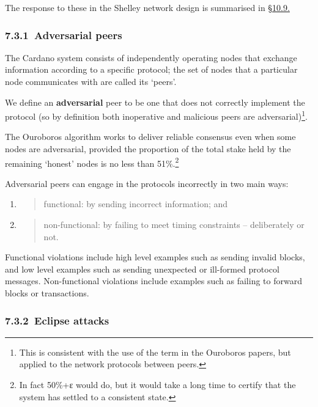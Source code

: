 \documentclass[11pt,a4paper]{article}
\begin{document}
The response to these in the Shelley network design is summarised in
\protect\hyperlink{summary-response-to-threats}{{§10.9.}}

\hypertarget{adversarial-peers}{%
\subsubsection{​7.3.1​~Adversarial peers}\label{adversarial-peers}}

The Cardano system consists of independently operating nodes that
exchange information according to a specific protocol; the set of nodes
that a particular node communicates with are called its `peers'.

We define an \textbf{adversarial} peer to be one that does not correctly
implement the protocol (so by definition both inoperative and malicious
peers are adversarial)\footnote{This is consistent with the use of the
  term in the Ouroboros papers, but applied to the network protocols
  between peers.}.

The Ouroboros algorithm works to deliver reliable consensus even when
some nodes are adversarial, provided the proportion of the total stake
held by the remaining `honest' nodes is no less than 51\%.\footnote{In
  fact 50\%+ε would do, but it would take a long time to certify that
  the system has settled to a consistent state.}

Adversarial peers can engage in the protocols incorrectly in two main
ways:

\begin{enumerate}
\def\labelenumi{\arabic{enumi}.}
\item
  \begin{quote}
  functional: by sending incorrect information; and
  \end{quote}
\item
  \begin{quote}
  non-functional: by failing to meet timing constraints -- deliberately
  or not.
  \end{quote}
\end{enumerate}

Functional violations include high level examples such as sending
invalid blocks, and low level examples such as sending unexpected or
ill-formed protocol messages. Non-functional violations include examples
such as failing to forward blocks or transactions.

\hypertarget{eclipse-attacks}{%
\subsubsection{​7.3.2​~Eclipse attacks}\label{eclipse-attacks}}
\end{document}
